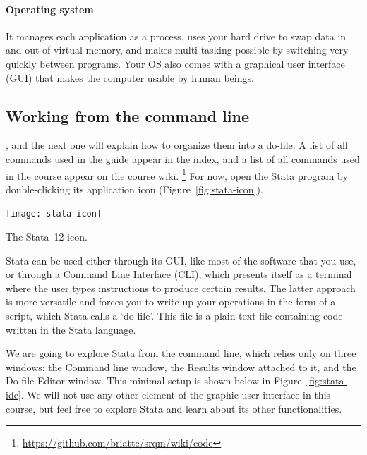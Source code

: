 %
%
\paragraph{Operating system}%

 It manages each application as a process, uses your hard drive to swap data in and out of virtual memory, and makes multi-tasking possible by switching very quickly between programs. Your OS also comes with a graphical user interface (GUI) that makes the computer usable by human beings.%

%
% 
%
\subsection{Working from the command line} %
  \label{sec:cli}

, and the next one will explain how to organize them into a do-file. A list of all commands used in the guide appear in the index, and a list of all commands used in the course appear on the course wiki.%
  \footnote{\url{https://github.com/briatte/srqm/wiki/code}} %
For now, open the Stata program by double-clicking its application icon (Figure~\ref{fig:stata-icon}).

  \begin{marginfigure}
    \texttt{[image: stata-icon]}
    \caption{The Stata~12 icon.}
    \label{fig:stata-icon}
  \end{marginfigure}

Stata can be used either through its GUI, like most of the software that you use, or through a Command Line Interface (CLI), which presents itself as a terminal where the user types instructions to produce certain results. The latter approach is more versatile and forces you to write up your operations in the form of a script, which Stata calls a `do-file'. This file is a plain text file containing code written in the Stata language.%

We are going to explore Stata from the command line, which relies only on three windows: the Command line window, the Results window attached to it, and the Do-file Editor window. This minimal setup is shown below in Figure~\ref{fig:stata-ide}. We will not use any other element of the graphic user interface in this course, but feel free to explore Stata and learn about its other functionalities.%

